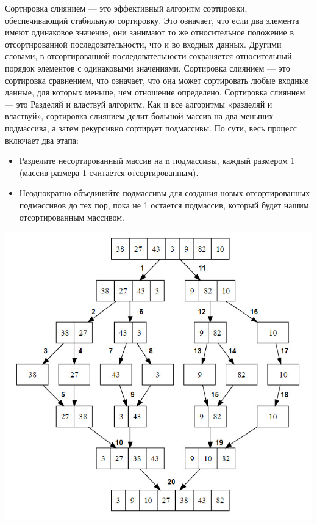 \documentclass[a4paper, 12pt]{article}
\begin{document}
\begin{flushleft}
Сортировка слиянием — это эффективный алгоритм сортировки, обеспечивающий стабильную сортировку. Это означает, что если два элемента имеют одинаковое значение, они занимают то же относительное положение в отсортированной последовательности, что и во входных данных. Другими словами, в отсортированной последовательности сохраняется относительный порядок элементов с одинаковыми значениями. Сортировка слиянием — это сортировка сравнением, что означает, что она может сортировать любые входные данные, для которых меньше, чем отношение определено.
Сортировка слиянием — это Разделяй и властвуй алгоритм. Как и все алгоритмы «разделяй и властвуй», сортировка слиянием делит большой массив на два меньших подмассива, а затем рекурсивно сортирует подмассивы. По сути, весь процесс включает два этапа:
 \begin{itemize}
\item {Разделите несортированный массив на n подмассивы, каждый размером 1 (массив размера 1 считается отсортированным).}
\item {Неоднократно объединяйте подмассивы для создания новых отсортированных подмассивов до тех пор, пока не 1 остается подмассив, который будет нашим отсортированным массивом.}
\end{itemize}
 \includegraphics[scale=0.5]{4.jpg}\\
 \end{flushleft}
\end{document}
